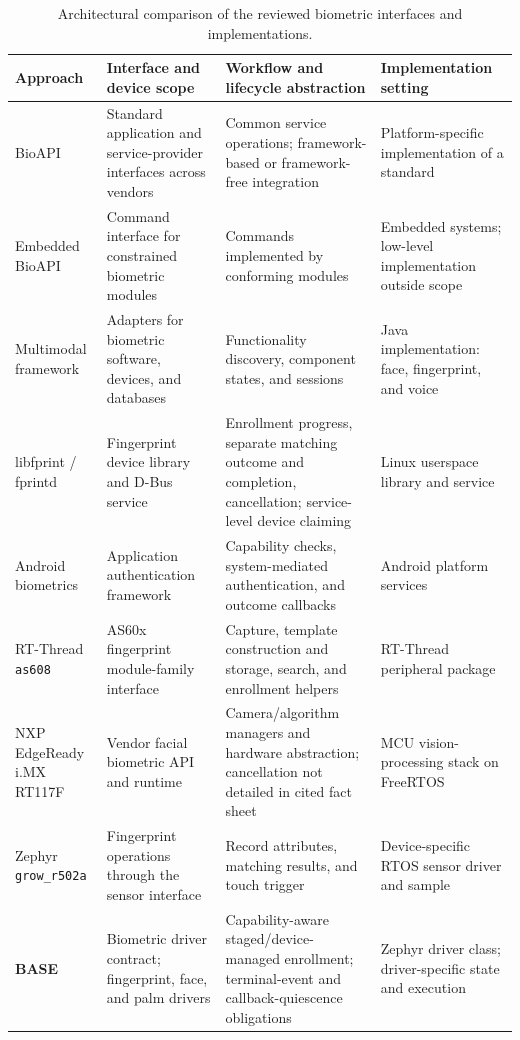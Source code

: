 \begin{table}[!t]
\centering
\caption{Architectural comparison of the reviewed biometric interfaces and implementations.}
\label{tab:gap_matrix}
\small
\renewcommand{\arraystretch}{1.18}
\setlength{\tabcolsep}{4pt}
\begin{tabularx}{\textwidth}{|>{\raggedright\arraybackslash}p{}|*{3}{>{\raggedright\arraybackslash}X|}}
\hline
\textbf{Approach} &
\textbf{Interface and device scope} &
\textbf{Workflow and lifecycle abstraction} &
\textbf{Implementation setting} \\
\hline
BioAPI \cite{iso19784} &
Standard application and service-provider interfaces across vendors &
Common service operations; framework-based or framework-free integration &
Platform-specific implementation of a standard \\
\hline
Embedded BioAPI \cite{iso29164} &
Command interface for constrained biometric modules &
Commands implemented by conforming modules &
Embedded systems; low-level implementation outside scope \\
\hline
Multimodal framework \cite{milovanovic2012interoperability} &
Adapters for biometric software, devices, and databases &
Functionality discovery, component states, and sessions &
Java implementation: face, fingerprint, and voice \\
\hline
libfprint / fprintd \cite{libfprint_device_api,fprintd_device_api} &
Fingerprint device library and D-Bus service &
Enrollment progress, separate matching outcome and completion, cancellation; service-level device claiming &
Linux userspace library and service \\
\hline
Android biometrics \cite{android_bio} &
Application authentication framework &
Capability checks, system-mediated authentication, and outcome callbacks &
Android platform services \\
\hline
RT-Thread \texttt{as608} \cite{rtthread_as608} &
AS60x fingerprint module-family interface &
Capture, template construction and storage, search, and enrollment helpers &
RT-Thread peripheral package \\
\hline
NXP EdgeReady i.MX RT117F \cite{nxp_rt117f_face} &
Vendor facial biometric API and runtime &
Camera/algorithm managers and hardware abstraction; cancellation not detailed in cited fact sheet &
MCU vision-processing stack on FreeRTOS \\
\hline
Zephyr \texttt{grow\_\allowbreak{}r502a} \cite{zephyr_r502a_sample} &
Fingerprint operations through the sensor interface &
Record attributes, matching results, and touch trigger &
Device-specific RTOS sensor driver and sample \\
\hline
\textbf{BASE} &
Biometric driver contract; fingerprint, face, and palm drivers &
Capability-aware staged/device-managed enrollment; terminal-event and callback-quiescence obligations &
Zephyr driver class; driver-specific state and execution \\
\hline
\end{tabularx}


\end{table}
